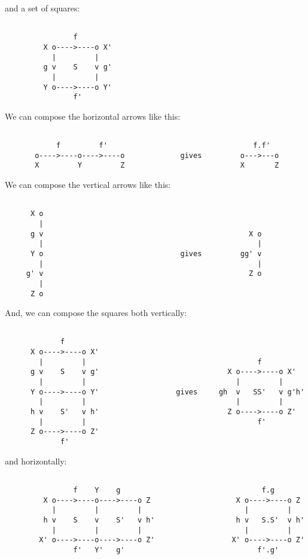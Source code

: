 and a set of squares:


\begin{verbatim}

                f
         X o---->----o X'
           |         |
         g v    S    v g'
           |         |
         Y o---->----o Y' 
                f'
\end{verbatim}
    
We can compose the horizontal arrows like this:


\begin{verbatim}

            f         f'                                  f.f'
       o---->----o---->----o             gives         o--->---o
       X         Y         Z                           X       Z
\end{verbatim}
    
We can compose the vertical arrows like this:


\begin{verbatim}

      X o
        |
      g v                                                X o
        |                                                  |
      Y o                                gives         gg' v
        |                                                  |
     g' v                                                Z o
        |
      Z o
\end{verbatim}
    
And, we can compose the squares both vertically: 


\begin{verbatim}

             f
      X o---->----o X'
        |         |                                        f
      g v    S    v g'                              X o---->----o X'
        |         |                                   |         |
      Y o---->----o Y'                  gives     gh  v   SS'   v g'h'
        |         |                                   |         |
      h v    S'   v h'                              Z o---->----o Z'
        |         |                                        f'
      Z o---->----o Z'
             f'
\end{verbatim}
    
and horizontally:


\begin{verbatim}

                f    Y    g                                 f.g
         X o---->----o---->----o Z                    X o---->----o Z
           |         |         |                        |         |
         h v    S    v    S'   v h'                   h v   S.S'  v h'  
           |         |         |                        |         |
        X' o---->----o---->----o Z'                  X' o---->----o Z' 
                f'   Y'   g'                               f'.g'
\end{verbatim}
    
